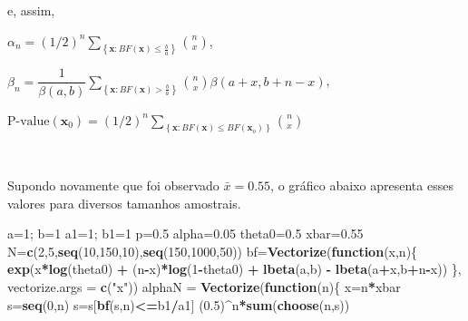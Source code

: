 \documentclass[
]{book}
\newenvironment{Shaded}{\begin{snugshade}}{\end{snugshade}}
\newcommand{\ControlFlowTok}[1]{\textcolor[rgb]{0.13,0.29,0.53}{\textbf{#1}}}
\newcommand{\DataTypeTok}[1]{\textcolor[rgb]{0.13,0.29,0.53}{#1}}
\newcommand{\DecValTok}[1]{\textcolor[rgb]{0.00,0.00,0.81}{#1}}
\newcommand{\FloatTok}[1]{\textcolor[rgb]{0.00,0.00,0.81}{#1}}
\newcommand{\KeywordTok}[1]{\textcolor[rgb]{0.13,0.29,0.53}{\textbf{#1}}}
\newcommand{\NormalTok}[1]{#1}
\newcommand{\OperatorTok}[1]{\textcolor[rgb]{0.81,0.36,0.00}{\textbf{#1}}}
\newcommand{\StringTok}[1]{\textcolor[rgb]{0.31,0.60,0.02}{#1}}
\begin{document}
e, assim,

\(\alpha_n = \displaystyle {(1/2)^{n}} \sum_{\left\{\boldsymbol x: BF(\boldsymbol x)\leq\frac{b}{a}\right\}}\binom{n}{x}\),

\(\beta_n = \displaystyle \dfrac{1}{{\beta(a,b)}} \sum_{\left\{\boldsymbol x: BF(\boldsymbol x)>\frac{b}{a}\right\}}\binom{n}{x}\beta(a+x,b+n-x)\),

\(\text{P-value}(\boldsymbol x_0) = \displaystyle {(1/2)^{n}} \sum_{\left\{\boldsymbol x: BF(\boldsymbol x)\leq BF(\boldsymbol x_o)\right\}}\binom{n}{x}\)

\(~\)

Supondo novamente que foi observado \(\bar{x}=0.55\), o gráfico abaixo apresenta esses valores para diversos tamanhos amostrais.

\begin{Shaded}
\begin{Highlighting}[]
\NormalTok{a=}\DecValTok{1}\NormalTok{; b=}\DecValTok{1}
\NormalTok{a1=}\DecValTok{1}\NormalTok{; b1=}\DecValTok{1}
\NormalTok{p=}\FloatTok{0.5}
\NormalTok{alpha=}\FloatTok{0.05}
\NormalTok{theta0=}\FloatTok{0.5}
\NormalTok{xbar=}\FloatTok{0.55}
\NormalTok{N=}\KeywordTok{c}\NormalTok{(}\DecValTok{2}\NormalTok{,}\DecValTok{5}\NormalTok{,}\KeywordTok{seq}\NormalTok{(}\DecValTok{10}\NormalTok{,}\DecValTok{150}\NormalTok{,}\DecValTok{10}\NormalTok{),}\KeywordTok{seq}\NormalTok{(}\DecValTok{150}\NormalTok{,}\DecValTok{1000}\NormalTok{,}\DecValTok{50}\NormalTok{))}
\NormalTok{bf=}\KeywordTok{Vectorize}\NormalTok{(}\ControlFlowTok{function}\NormalTok{(x,n)\{}
  \KeywordTok{exp}\NormalTok{(x}\OperatorTok{*}\KeywordTok{log}\NormalTok{(theta0) }\OperatorTok{+}\StringTok{ }\NormalTok{(n}\OperatorTok{-}\NormalTok{x)}\OperatorTok{*}\KeywordTok{log}\NormalTok{(}\DecValTok{1}\OperatorTok{-}\NormalTok{theta0) }\OperatorTok{+}\StringTok{ }\KeywordTok{lbeta}\NormalTok{(a,b) }\OperatorTok{-}\StringTok{ }\KeywordTok{lbeta}\NormalTok{(a}\OperatorTok{+}\NormalTok{x,b}\OperatorTok{+}\NormalTok{n}\OperatorTok{-}\NormalTok{x))}
\NormalTok{\}, }\DataTypeTok{vectorize.args =} \KeywordTok{c}\NormalTok{(}\StringTok{"x"}\NormalTok{))}
\NormalTok{alphaN =}\StringTok{ }\KeywordTok{Vectorize}\NormalTok{(}\ControlFlowTok{function}\NormalTok{(n)\{}
\NormalTok{  x=n}\OperatorTok{*}\NormalTok{xbar}
\NormalTok{  s=}\KeywordTok{seq}\NormalTok{(}\DecValTok{0}\NormalTok{,n)}
\NormalTok{  s=s[}\KeywordTok{bf}\NormalTok{(s,n)}\OperatorTok{<=}\NormalTok{b1}\OperatorTok{/}\NormalTok{a1]}
\NormalTok{  (}\FloatTok{0.5}\NormalTok{)}\OperatorTok{^}\NormalTok{n}\OperatorTok{*}\KeywordTok{sum}\NormalTok{(}\KeywordTok{choose}\NormalTok{(n,s))}

\end{Highlighting}
\end{Shaded}
\end{document}

